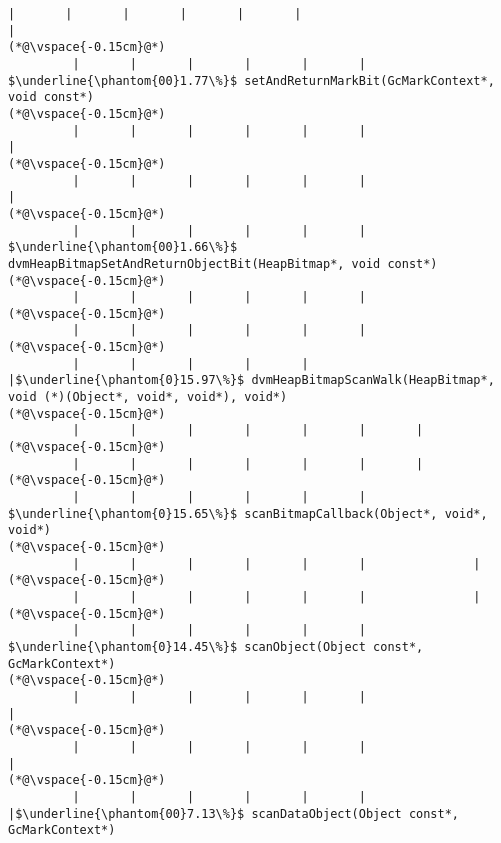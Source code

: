 \begin{lstlisting}[caption=NewDirectByteBuffer, label=profile:C2JNewDirectBuffer-512, numberbychapter=true, frame=lines, float, floatplacement=t]
         |       |       |       |       |       |                                       |
(*@\vspace{-0.15cm}@*)
         |       |       |       |       |       |                                        $\underline{\phantom{00}1.77\%}$ setAndReturnMarkBit(GcMarkContext*, void const*)
(*@\vspace{-0.15cm}@*)
         |       |       |       |       |       |                                               |
(*@\vspace{-0.15cm}@*)
         |       |       |       |       |       |                                               |
(*@\vspace{-0.15cm}@*)
         |       |       |       |       |       |                                                $\underline{\phantom{00}1.66\%}$ dvmHeapBitmapSetAndReturnObjectBit(HeapBitmap*, void const*)
(*@\vspace{-0.15cm}@*)
         |       |       |       |       |       |
(*@\vspace{-0.15cm}@*)
         |       |       |       |       |       |
(*@\vspace{-0.15cm}@*)
         |       |       |       |       |       |$\underline{\phantom{0}15.97\%}$ dvmHeapBitmapScanWalk(HeapBitmap*, void (*)(Object*, void*, void*), void*)
(*@\vspace{-0.15cm}@*)
         |       |       |       |       |       |       |
(*@\vspace{-0.15cm}@*)
         |       |       |       |       |       |       |
(*@\vspace{-0.15cm}@*)
         |       |       |       |       |       |        $\underline{\phantom{0}15.65\%}$ scanBitmapCallback(Object*, void*, void*)
(*@\vspace{-0.15cm}@*)
         |       |       |       |       |       |               |
(*@\vspace{-0.15cm}@*)
         |       |       |       |       |       |               |
(*@\vspace{-0.15cm}@*)
         |       |       |       |       |       |                $\underline{\phantom{0}14.45\%}$ scanObject(Object const*, GcMarkContext*)
(*@\vspace{-0.15cm}@*)
         |       |       |       |       |       |                       |
(*@\vspace{-0.15cm}@*)
         |       |       |       |       |       |                       |
(*@\vspace{-0.15cm}@*)
         |       |       |       |       |       |                       |$\underline{\phantom{00}7.13\%}$ scanDataObject(Object const*, GcMarkContext*)

\end{lstlisting}
